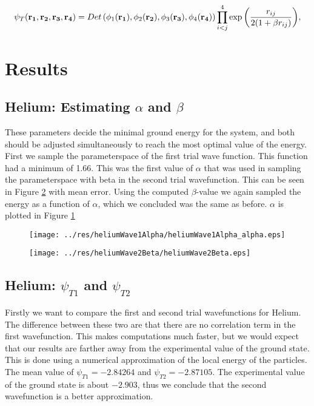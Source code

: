 \documentclass[twocolumn]{article}[10pt]
\newcommand{\eq}[1]{\begin{align*}#1\end{align*}}
\begin{document}
\eq{
   \psi_{T}({\bf r_1},{\bf r_2}, {\bf r_3}, {\bf r_4}) = 
   Det\left(\phi_{1}({\bf r_1}),\phi_{2}({\bf r_2}),
   \phi_{3}({\bf r_3}),\phi_{4}({\bf r_4})\right)
   \prod_{i<j}^{4}\exp{\left(\frac{r_{ij}}{2(1+\beta r_{ij})}\right)}, 
 }

\section{Results}
\subsection{Helium: Estimating $\alpha$ and $\beta$}
These parameters decide the minimal ground energy for the system, and both
should be adjusted simultaneously to reach the most optimal value of the
energy. First we sample the parameterspace of the first trial wave function. 
This function had a minimum of 1.66. This was the first value of $\alpha$ that was used in sampling the 
parameterspace with beta in the second trial wavefunction. 
This can  be seen in Figure \ref{fig:1} with mean error. 
Using the computed $\beta$-value we again
sampled the energy as a function of $\alpha$, which we concluded was 
the same as before. $\alpha$ is plotted in Figure \ref{fig:2}

\begin{figure}[h!]
	\centering
	\texttt{[image: ../res/heliumWave1Alpha/heliumWave1Alpha\_alpha.eps]}
	\caption{}\label{fig:2}
\end{figure}

\begin{figure}[h!]
	\centering
	\texttt{[image: ../res/heliumWave2Beta/heliumWave2Beta.eps]}
	\caption{}\label{fig:1}
\end{figure}

\subsection{Helium: $\psi_{T1}$ and $\psi_{T2}$ }
Firstly we want to compare the first and second trial wavefunctions for Helium. 
The difference between these two are that there are no correlation term
in the first wavefunction. This makes computations much faster, but we
would expect that our results are farther away from the experimental 
value of the ground state. This is done using a numerical approximation 
of the local energy of the particles. The mean value of 
$\psi_{T1} = -2.84264$ and $\psi_{T2} = -2.87105$. The experimental value of
the ground state is about $-2.903$, thus we conclude that the second wavefunction is a better approximation.
\end{document}
